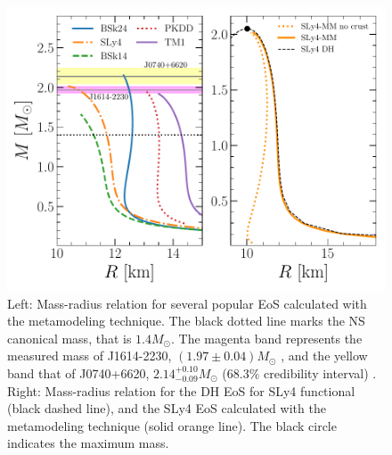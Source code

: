 \begin{figure}[!t]
\begin{center}
  \includegraphics[width=0.9\linewidth]{figures/mr_popular.pdf}
\end{center}
\caption[Mass-radius relation for several popular EoS]{Left: Mass-radius 
  relation for several popular EoS calculated
  with the metamodeling technique. The black dotted line marks the NS 
canonical mass, that is $1.4M_\odot$. The magenta band represents the measured 
mass of J1614-2230, $(1.97 \pm 0.04)M_\odot$ \cite{Demorest2010}, and the 
yellow band that of J0740+6620, $2.14_{-0.09}^{+0.10}M_\odot$ ($68.3\%$ 
credibility interval) \cite{Cromartie2020}.
Right: Mass-radius relation for the DH EoS for SLy4 functional (black dashed
line), and the SLy4 EoS calculated with the metamodeling technique (solid
orange line). The black circle indicates the maximum mass.}\label{fig:mr_popular}
\end{figure}
 
